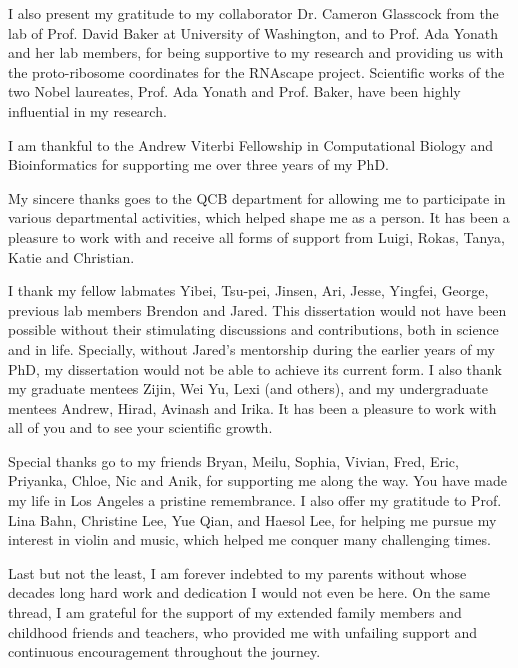 I also present my gratitude to my collaborator Dr. Cameron Glasscock from the lab of Prof. David Baker at University of Washington, and to Prof. Ada Yonath and her lab members, for being supportive to my research and providing us with the proto-ribosome coordinates for the RNAscape project. Scientific works of the two Nobel laureates, Prof. Ada Yonath and Prof. Baker, have been highly influential in my research.

I am thankful to the Andrew Viterbi Fellowship in Computational Biology and Bioinformatics for supporting me over three years of my PhD.

My sincere thanks goes to the QCB department for allowing me to participate in various departmental activities, which helped shape me as a person. It has been a pleasure to work with and receive all forms of support from Luigi, Rokas, Tanya, Katie and Christian.

I thank my fellow labmates Yibei, Tsu-pei, Jinsen, Ari, Jesse, Yingfei, George, previous lab members Brendon and Jared. This dissertation would not have been possible without their stimulating discussions and contributions, both in science and in life. Specially, without Jared's mentorship during the earlier years of my PhD, my dissertation would not be able to achieve its current form. I also thank my graduate mentees Zijin, Wei Yu, Lexi (and others), and my undergraduate mentees Andrew, Hirad, Avinash and Irika. It has been a pleasure to work with all of you and to see your scientific growth. 

Special thanks go to my friends Bryan, Meilu, Sophia, Vivian, Fred, Eric, Priyanka, Chloe, Nic and Anik, for supporting me along the way. You have made my life in Los Angeles a pristine remembrance. I also offer my gratitude to Prof. Lina Bahn, Christine Lee, Yue Qian, and Haesol Lee, for helping me pursue my interest in violin and music, which helped me conquer many challenging times.

Last but not the least, I am forever indebted to my parents without whose decades long hard work and dedication I would not even be here. On the same thread, I am grateful for the support of my extended family members and childhood friends and teachers, who provided me with unfailing support and continuous encouragement throughout the journey.